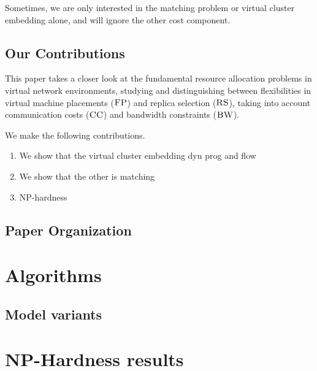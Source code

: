 \documentclass[9pt,twocolumn]{scrartcl}
\newcommand{\CC}{\textsc{CC}}
\newcommand{\FP}{\textsc{FP}}
\newcommand{\RS}{\textsc{RS}}
\newcommand{\BW}{\textsc{BW}}
\begin{document}
Sometimes, we are only interested in the matching problem or virtual cluster embedding alone,
and will ignore the other cost component.




\subsection{Our Contributions}

This paper takes a closer look at the fundamental resource allocation problems
in virtual network environments, studying and distinguishing between flexibilities in virtual machine placements ($\FP$) and
replica selection ($\RS$), taking into account communication costs ($\CC$) and bandwidth constraints ($\BW$).

We make the following contributions.
\begin{enumerate}
\item We show that the virtual cluster embedding dyn prog and flow
\item We show that the other is matching
\item NP-hardness
\end{enumerate}



\subsection{Paper Organization}


\section{Algorithms}

\subsection{Model variants}










\section{NP-Hardness results}
\end{document}
